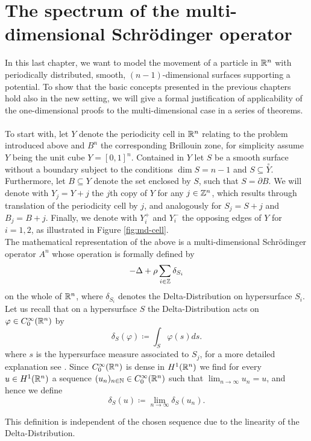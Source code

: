 \chapter{The spectrum of the multi-dimensional Schrödinger operator}  \label{chap:7} 

In this last chapter, we want to model the movement of a particle in $\mathbb{R}^{n}$ with periodically distributed, smooth, $(n-1)$-dimensional surfaces supporting a potential. To show that the basic concepts presented in the previous chapters hold also in the new setting, we will give a formal justification of applicability of the one-dimensional proofs to the multi-dimensional case in a series of theorems.
~\\

To start with, let $Y$ denote the periodicity cell in $\mathbb{R}^{n}$ relating to the problem introduced above and $B^{n}$ the corresponding Brillouin zone, for simplicity assume $Y$ being the unit cube $Y = [0, 1]^{n}$. Contained in $Y$ let $S$ be a smooth surface without a boundary subject to the conditions $\dim S = n - 1$ and $S \subseteq \overset{\circ}{Y}$. Furthermore, let $B \subseteq Y$ denote the set enclosed by $S$, such that $S = \partial B$. We will denote with $Y_{j} = Y + j$ the $j$th copy of $Y$ for any $j \in \mathbb{Z}^{n}$, which results through translation of the periodicity cell by $j$, and analogously for $S_{j} = S + j$ and $B_{j} = B + j$. Finally, we denote with $Y_{i}^{+}$ and $Y_{i}^{-}$ the opposing edges of $Y$ for $i = 1, 2$, as illustrated in Figure \ref{fig:md-cell}.
~\\

The mathematical representation of the above is a multi-dimensional Schrödinger operator $A^{n}$ whose operation is formally defined by
\begin{equation}
	- \Delta + \rho \sum_{i \in \mathbb{Z}} \delta_{S_{i}} \label{eq:7.1-md_the_operator_A_formallyy}
\end{equation}
on the whole of $\mathbb{R}^{n}$, where $\delta_{S_{i}}$ denotes the Delta-Distribution on hypersurface $S_{i}$. Let us recall that on a hypersurface $S$ the Delta-Distribution acts on $\varphi \in C_{0}^{\infty}(\mathbb{R}^{n})$ by 
	\[ \delta_{S}\left(\varphi\right) \coloneqq \int_{S} \varphi(s) ds . \]
where $s$ is the hypersurface measure associated to $S_{j}$, for a more detailed explanation see \cite[chapter 14]{forster2012analysis}. Since $C_{0}^{\infty}(\mathbb{R}^{n})$ is dense in $H^{1}(\mathbb{R}^{n})$ we find for every $u \in H^{1}(\mathbb{R}^{n})$ a sequence $(u_{n})_{n \in \mathbb{N}} \in C_{0}^{\infty}(\mathbb{R}^{n})$ such that $\lim_{n \rightarrow \infty} u_{n} = u$, and hence we define
	\[ \delta_{S}\left(u\right) \coloneqq \lim_{n \rightarrow \infty} \delta_{S}\left(u_{n}\right) . \]
\begin{remark}
	This definition is independent of the chosen sequence due to the linearity of the Delta-Distribution. %
\end{remark}


